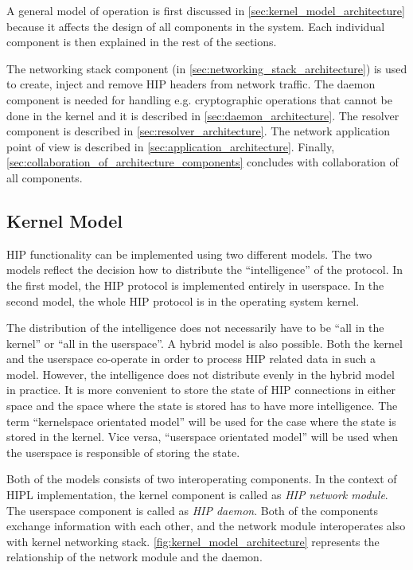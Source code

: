 A general model of operation is first discussed in
\autoref{sec:kernel_model_architecture} because it affects the design
of all components in the system. Each individual component is then
explained in the rest of the sections.

The networking stack component (in
\autoref{sec:networking_stack_architecture}) is used to create, inject
and remove HIP headers from network traffic. The daemon component is
needed for handling e.g. cryptographic operations that cannot be done
in the kernel and it is described in
\autoref{sec:daemon_architecture}. The resolver component is described
in \autoref{sec:resolver_architecture}. The network application point
of view is described in
\autoref{sec:application_architecture}. Finally,
\autoref{sec:collaboration_of_architecture_components} concludes with
collaboration of all components.

\subsection{Kernel Model}
\label{sec:kernel_model_architecture}

HIP functionality can be implemented using two different models. The
two models reflect the decision how to distribute the ``intelligence''
of the protocol. In the first model, the HIP protocol is implemented
entirely in userspace. In the second model, the whole HIP protocol is
in the operating system kernel.

The distribution of the intelligence does not necessarily have to be
``all in the kernel'' or ``all in the userspace''. A hybrid model is
also possible. Both the kernel and the userspace co-operate in order
to process HIP related data in such a model. However, the intelligence
does not distribute evenly in the hybrid model in practice. It is more
convenient to store the state of HIP connections in either space and
the space where the state is stored has to have more intelligence. The
term ``kernelspace orientated model'' will be used for the case where
the state is stored in the kernel. Vice versa, ``userspace orientated
model'' will be used when the userspace is responsible of storing the
state.

Both of the models consists of two interoperating components. In the
context of HIPL implementation, the kernel component is called as
\textit{HIP network module}. The userspace component is called as
\textit{HIP daemon}. Both of the components exchange information with
each other, and the network module interoperates also with kernel
networking stack. \autoref{fig:kernel_model_architecture} represents
the relationship of the network module and the daemon.


